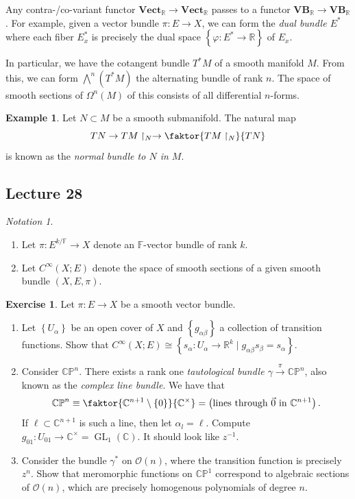 \documentclass[10pt,letterpaper,cm]{nupset}
\theoremstyle{definition}
\newtheorem{exmp}[definition]{Example}
\theoremstyle{theorem}
\newtheorem{exercise}[definition]{Exercise}
\theoremstyle{remark}
\newtheorem*{notation}{Notation}
\newcommand{\C}{\mathbb C}
\newcommand{\CP}{\mathbb{CP}}
\newcommand{\F}{\mathbb F}
\newcommand{\R}{\mathbb{R}}
\newcommand{\1}{\mathbb{1}}
\newcommand{\0}{\vec 0}
\DeclareMathOperator{\GL}{GL}
\begin{document}
\medskip

Any contra-/co-variant functor $\mathbf{Vect}_{\mathbb{R}} \to \mathbf{Vect}_{\mathbb{R}} $ passes to a functor $\mathbf{VB}_{\R} \to \mathbf{VB}_{\R}$. For example,  given a vector bundle $\pi : E \to X$, we can form the \textit{dual bundle $E^{\ast}$} where each fiber $E^{\ast}_x$ is precisely the dual space $\left\{\varphi : E^{\ast} \to \mathbb{R}\right\}$ of  $E_x$. 

In particular, we have the cotangent bundle $T^{\ast}{M}$ of a smooth manifold $M$. From this, we can form $\bigwedge^{n}(T^{\ast}{M})$ the alternating bundle of rank $n$. The space of smooth sections of $\Omega^n(M)$ of this consists of all differential $n$-forms.

\smallskip

\begin{exmp}
Let $N\subset M$ be a smooth submanifold. The natural map
\[
T{N} \to T{M}\restriction_N \to \faktor{T{M}\restriction_N}{T{N}}
\] is known as the \textit{normal bundle to $N$ in $M$}.
\end{exmp}

\subsection{Lecture 28}

\begin{notation} $ $
\begin{enumerate}
\item Let $\pi : E^{k/\F} \to X$ denote an $\F$-vector bundle of rank $k$. 
\item Let $C^{\infty}(X; E)$ denote the space of smooth sections of a given smooth bundle $(X, E, \pi)$.
\end{enumerate}
\end{notation}

\begin{exercise} Let $\pi: E \to X$ be a smooth vector bundle.
\begin{enumerate}
\item  Let $\left\{U_{\alpha}\right\}$ be an open cover of $X$ and $\left\{g_{\alpha{\beta}}\right\}$  a collection of transition functions. Show that $C^{\infty}(X; E) \cong \left\{ s_{\alpha} : U_{\alpha} \to \R^k \mid g_{\alpha{\beta}} s_{\beta} = s_{\alpha}\right\}$.
\item Consider $\CP^n$. There exists a rank one \textit{tautological bundle $ \gamma \overset{\pi}{\longrightarrow} \CP^n$}, also known as the \textit{complex line bundle}. We have that $$\CP^n \equiv \faktor{\C^{n+1}\setminus \{0\}}{\C^{\times}} = \left(\text{lines through }\vec{0} \text{ in }\C^{n+1}\right).$$ If $\ell \subset \C^{n+1}$ is such a line, then let $\alpha_l = \ell$. Compute $g_{01} : U_{01} \to \C^{\times} = \GL_1(\C)$. It should look like $z^{-1}$.
\item Consider the bundle $\gamma^{\ast}$ on $\mathcal{O}(n)$, where the transition function is precisely $z^n$. Show that meromorphic functions on $\CP^1$ correspond to algebraic sections of $\mathcal{O}(n)$, which are precisely homogenous polynomials of degree $n$.
\end{enumerate}
\end{exercise}
\end{document}

